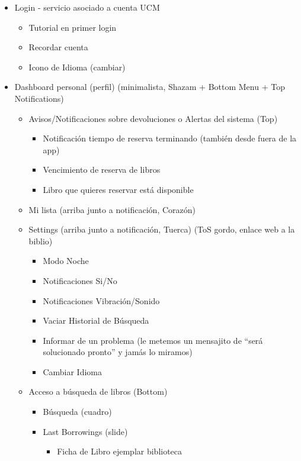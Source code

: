 \documentclass[12pt]{article}
\begin{document}
\begin{itemize}
\item Login - servicio asociado a cuenta UCM
\begin{itemize}
\item Tutorial en primer login
\item Recordar cuenta
\item Icono de Idioma (cambiar)
\end{itemize}
\item Dashboard personal (perfil) (minimalista, Shazam + Bottom Menu + Top Notifications)
\begin{itemize}
\item Avisos/Notificaciones sobre devoluciones o Alertas del sistema (Top)
\begin{itemize}
\item Notificación tiempo de reserva terminando (también desde fuera de la app)
\item Vencimiento de reserva de libros
\item Libro que quieres reservar está disponible

\end{itemize}

\item Mi lista (arriba junto a notificación, Corazón)

\item Settings (arriba junto a notificación, Tuerca) (ToS gordo, enlace web a la biblio)

\begin{itemize}
\item Modo Noche
\item Notificaciones Si/No
\item Notificaciones Vibración/Sonido
\item Vaciar Historial de Búsqueda
\item Informar de un problema (le metemos un mensajito de “será solucionado pronto” y jamás lo miramos)
\item Cambiar Idioma

\end{itemize}

\item Acceso a búsqueda de libros (Bottom)

\begin{itemize}
\item Búsqueda (cuadro)
\item Last Borrowings (slide)
\begin{itemize}
\item Ficha de Libro ejemplar biblioteca


\end{itemize}
\end{itemize}
\end{itemize}
\end{itemize}
\end{document}
